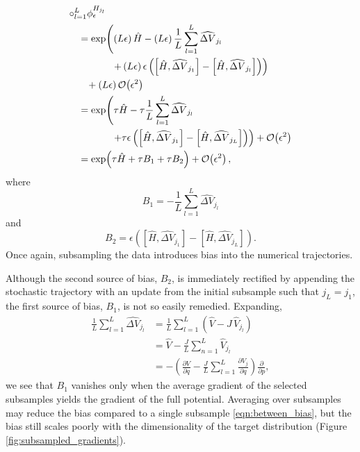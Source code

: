 \documentclass{article}
\begin{document}
%
\begin{align*}
\circ_{l = 1}^{L} \phi^{H_{j_{l}}}_{\epsilon}
& \\
& \hspace{-10mm} =
\exp \! \left( 
\left( L \epsilon \right) \hat{H} 
- \left( L \epsilon \right) \frac{1}{L} \sum_{l = 1}^{L}  \widehat{ \Delta V}_{j_{l}}
\right.
\\
& \hspace{2mm} \left.
+ \left( L \epsilon \right) \epsilon 
\left( \left[ \hat{H}, \widehat{ \Delta V}_{j_{1}} \right] 
- \left[ \hat{H}, \widehat{ \Delta V}_{j_{l}} \right] \right) 
\right)
\\
& \hspace{-7mm}
+ \left(L \epsilon \right) \mathcal{O} \! \left( \epsilon^{2} \right)
\\
& \hspace{-10mm} =
\exp \! \left( \tau \hat{H} - \tau \frac{1}{L} \sum_{l = 1}^{L} \widehat{ \Delta V}_{j_{l}}
\right.
\\
& \hspace{2mm} \left.
+ \tau \epsilon 
\left( \left[ \hat{H}, \widehat{ \Delta V}_{j_{1}} \right] 
- \left[ \hat{H}, \widehat{ \Delta V}_{j_{L}} \right] \right)
\right)
+ \mathcal{O} \! \left( \epsilon^{2} \right)
\\
& \hspace{-10mm} =
\exp \! \left( \tau \hat{H} + \tau B_{1} + \tau B_{2} \right)
+ \mathcal{O} \! \left( \epsilon^{2} \right),
\end{align*}
%
where
%
\begin{equation*}
B_{1} = - \frac{1}{L} \sum_{l = 1}^{L} \widehat{ \Delta V}_{j_{l}}
\end{equation*}
%
and
%
\begin{equation*}
B_{2} = \epsilon 
\left( \left[ \hat{H}, \widehat{ \Delta V}_{j_{1}} \right] 
- \left[ \hat{H}, \widehat{ \Delta V}_{j_{L}} \right] \right).
\end{equation*}
%
Once again, subsampling the data introduces bias into the numerical trajectories.

Although the second source of bias, $B_{2}$, is immediately rectified by appending the 
stochastic trajectory with an update from the initial subsample such that $j_{L} = j_{1}$, 
the first source of bias, $B_{1}$, is not so easily remedied.  Expanding,
%
\begin{align*}
\frac{1}{L} \sum_{l = 1}^{L}  \widehat{ \Delta V}_{j_{l}}
&=
\frac{1}{L} \sum_{l = 1}^{L} \left( \hat{V} - J \, \hat{V}_{j_{l}} \right)
\\
&=
\hat{V} - \frac{J}{L} \sum_{n = 1}^{L} \hat{V}_{j_{l}}
\\
&=
- \left( \frac{ \partial V }{ \partial q }  - \frac{J}{L} \sum_{l = 1}^{L} \frac{ \partial V_{j} }{ \partial q }
\right) \frac{ \partial }{ \partial p },
\end{align*}
%
we see that $B_{1}$ vanishes only when the average gradient of the selected 
subsamples yields the gradient of the full potential.  Averaging over subsamples 
may reduce the bias compared to a single subsample \eqref{eqn:between_bias}, 
but the bias still scales poorly with the dimensionality of the target distribution 
(Figure \ref{fig:subsampled_gradients}).
\end{document}

